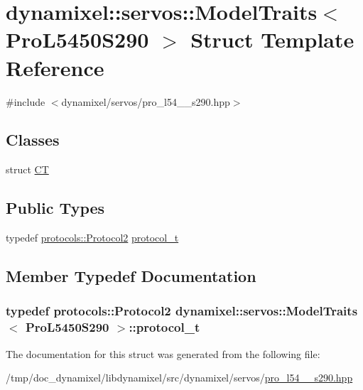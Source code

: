 \hypertarget{structdynamixel_1_1servos_1_1_model_traits_3_01_pro_l5450_s290_01_4}{}\section{dynamixel\+:\+:servos\+:\+:Model\+Traits$<$ Pro\+L5450\+S290 $>$ Struct Template Reference}
\label{structdynamixel_1_1servos_1_1_model_traits_3_01_pro_l5450_s290_01_4}


{\ttfamily \#include $<$dynamixel/servos/pro\+\_\+l54\+\_\+\_\+s290.\+hpp$>$}

\subsection*{Classes}
\begin{DoxyCompactItemize}
\item 
struct \hyperlink{structdynamixel_1_1servos_1_1_model_traits_3_01_pro_l5450_s290_01_4_1_1_c_t}{C\+T}
\end{DoxyCompactItemize}
\subsection*{Public Types}
\begin{DoxyCompactItemize}
\item 
typedef \hyperlink{classdynamixel_1_1protocols_1_1_protocol2}{protocols\+::\+Protocol2} \hyperlink{structdynamixel_1_1servos_1_1_model_traits_3_01_pro_l5450_s290_01_4_a1c4916b8670ad8da2e5502d488c4bc5f}{protocol\+\_\+t}
\end{DoxyCompactItemize}


\subsection{Member Typedef Documentation}
\hypertarget{structdynamixel_1_1servos_1_1_model_traits_3_01_pro_l5450_s290_01_4_a1c4916b8670ad8da2e5502d488c4bc5f}{}
\subsubsection[{protocol\+\_\+t}]{\setlength{\rightskip}{0pt plus 5cm}typedef {\bf protocols\+::\+Protocol2} {\bf dynamixel\+::servos\+::\+Model\+Traits}$<$ {\bf Pro\+L5450\+S290} $>$\+::{\bf protocol\+\_\+t}}\label{structdynamixel_1_1servos_1_1_model_traits_3_01_pro_l5450_s290_01_4_a1c4916b8670ad8da2e5502d488c4bc5f}


The documentation for this struct was generated from the following file\+:\begin{DoxyCompactItemize}
\item 
/tmp/doc\+\_\+dynamixel/libdynamixel/src/dynamixel/servos/\hyperlink{pro__l54__50__s290_8hpp}{pro\+\_\+l54\+\_\+\_\+s290.\+hpp}\end{DoxyCompactItemize}
